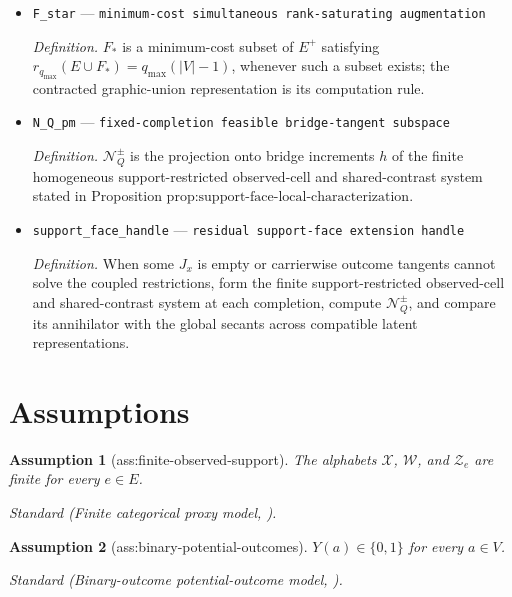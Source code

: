 \documentclass{article}
\newtheorem{assumption}{Assumption}
\begin{document}
\begin{itemize}
  \item \texttt{F\_\allowbreak{}star} --- \texttt{minimum-\allowbreak{}cost simultaneous rank-\allowbreak{}saturating augmentation}
  \par\smallskip\noindent\emph{Definition.} \(F_*\) is a minimum-cost subset of \(E^+\) satisfying \(r_{q_{\max}}(E\cup F_*)=q_{\max}(|V|-1)\), whenever such a subset exists; the contracted graphic-union representation is its computation rule.
  \item \texttt{N\_\allowbreak{}Q\_\allowbreak{}pm} --- \texttt{fixed-\allowbreak{}completion feasible bridge-\allowbreak{}tangent subspace}
  \par\smallskip\noindent\emph{Definition.} \(\mathcal N_Q^{\pm}\) is the projection onto bridge increments \(h\) of the finite homogeneous support-restricted observed-cell and shared-contrast system stated in Proposition \(\text{prop:support-face-local-characterization}\).
  \item \texttt{support\_\allowbreak{}face\_\allowbreak{}handle} --- \texttt{residual support-\allowbreak{}face extension handle}
  \par\smallskip\noindent\emph{Definition.} When some \(J_x\) is empty or carrierwise outcome tangents cannot solve the coupled restrictions, form the finite support-restricted observed-cell and shared-contrast system at each completion, compute \(\mathcal N_Q^{\pm}\), and compare its annihilator with the global secants across compatible latent representations.
\end{itemize}

\section{Assumptions}

\begin{assumption}[ass:finite-observed-support]\label{ass:finite-observed-support}
The alphabets \(\mathcal X\), \(\mathcal W\), and \(\mathcal Z_e\) are finite for every \(e\in E\).
\par\smallskip\noindent\emph{Standard} (Finite categorical proxy model, \cite{MiaoGengTchetgen2018}).
\end{assumption}

\begin{assumption}[ass:binary-potential-outcomes]\label{ass:binary-potential-outcomes}
\(Y(a)\in\{0,1\}\) for every \(a\in V\).
\par\smallskip\noindent\emph{Standard} (Binary-outcome potential-outcome model, \cite{SuRytgaardRavnEriksson2026}).
\end{assumption}
\end{document}
